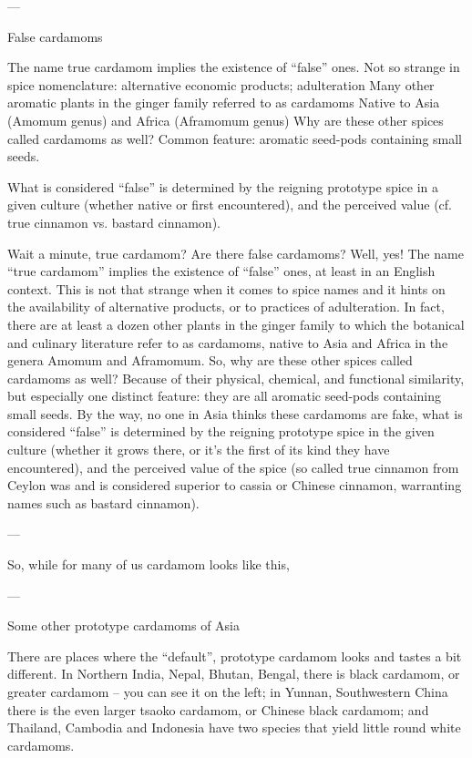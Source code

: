 \documentclass[12pt]{article}
\begin{document}
---

False cardamoms

The name true cardamom implies the existence of “false” ones.
Not so strange in spice nomenclature: alternative economic products; adulteration
Many other aromatic plants in the ginger family referred to as cardamoms
Native to Asia (Amomum genus) and Africa (Aframomum genus)
Why are these other spices called cardamoms as well?
Common feature: aromatic seed-pods containing small seeds.

What is considered “false” is determined by the reigning prototype spice in a given culture (whether native or first encountered), and the perceived value (cf. true cinnamon vs. bastard cinnamon).

Wait a minute, true cardamom? Are there false cardamoms? Well, yes! The name “true cardamom” implies the existence of “false” ones, at least in an English context.
This is not that strange when it comes to spice names and it hints on the availability of alternative products, or to practices of adulteration. 
In fact, there are at least a dozen other plants in the ginger family to which the botanical and culinary literature refer to as cardamoms, 
native to Asia and Africa in the genera Amomum and Aframomum.
So, why are these other spices called cardamoms as well? Because of their physical, chemical, and functional similarity, but especially one distinct feature: they are all aromatic seed-pods containing small seeds. 
By the way, no one in Asia thinks these cardamoms are fake, what is considered “false” is determined by the reigning prototype spice in the given culture (whether it grows there, or it’s the first of its kind they have encountered), and the perceived value of the spice (so called true cinnamon from Ceylon was and is considered superior to cassia or Chinese cinnamon, warranting names such as bastard cinnamon).

---

So, while for many of us cardamom looks like this,

---

Some other prototype cardamoms of Asia

There are places where the “default”, prototype cardamom looks and tastes a bit different.
In Northern India, Nepal, Bhutan, Bengal, there is black cardamom, or greater cardamom – you can see it on the left; in Yunnan, Southwestern China there is the even larger tsaoko cardamom, or Chinese black cardamom; and Thailand, Cambodia and Indonesia have two species that yield little round white cardamoms. 
\end{document}

